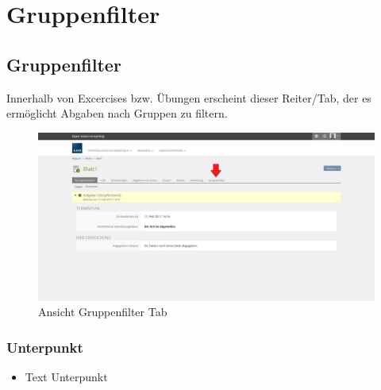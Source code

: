 \chapter{Gruppenfilter}\label{gruppenfilter}
\minitoc
\clearpage
\section{Gruppenfilter}
Innerhalb von Excercises bzw. Übungen erscheint dieser Reiter/Tab, der es ermöglicht Abgaben nach Gruppen zu filtern. 

\begin{figure}
	\centering
	\includegraphics[width=1\textwidth]{img/excerciseGruppenfilter.jpg}
	\caption{Ansicht Gruppenfilter Tab}
\end{figure}

\subsection*{Unterpunkt}
\begin{itemize}
	\item Text Unterpunkt
\end{itemize}

\clearpage
